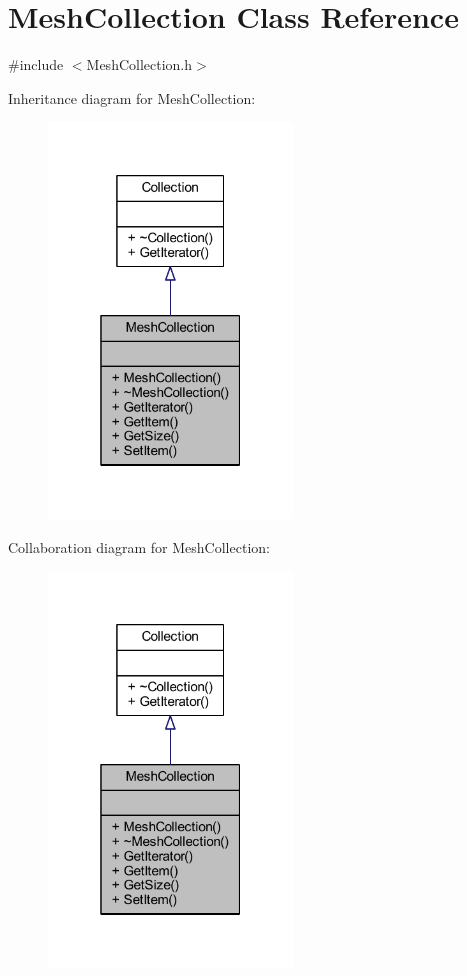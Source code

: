 \hypertarget{class_mesh_collection}{}\section{Mesh\+Collection Class Reference}
\label{class_mesh_collection}


{\ttfamily \#include $<$Mesh\+Collection.\+h$>$}



Inheritance diagram for Mesh\+Collection\+:\nopagebreak
\begin{figure}[H]
\begin{center}
\leavevmode
\includegraphics[width=184pt]{class_mesh_collection__inherit__graph}
\end{center}
\end{figure}


Collaboration diagram for Mesh\+Collection\+:\nopagebreak
\begin{figure}[H]
\begin{center}
\leavevmode
\includegraphics[width=184pt]{class_mesh_collection__coll__graph}
\end{center}
\end{figure}
